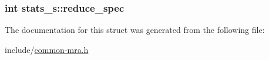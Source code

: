 \hypertarget{structstats__s_a72a455323e2db452773d6e4d21fe8554}{
\subsubsection[{reduce\-\_\-spec}]{\setlength{\rightskip}{0pt plus 5cm}int {\bf stats\-\_\-s\-::reduce\-\_\-spec}}}\label{structstats__s_a72a455323e2db452773d6e4d21fe8554}


\-The documentation for this struct was generated from the following file\-:\begin{DoxyCompactItemize}
\item 
include/\hyperlink{common-mra_8h}{common-\/mra.\-h}\end{DoxyCompactItemize}
